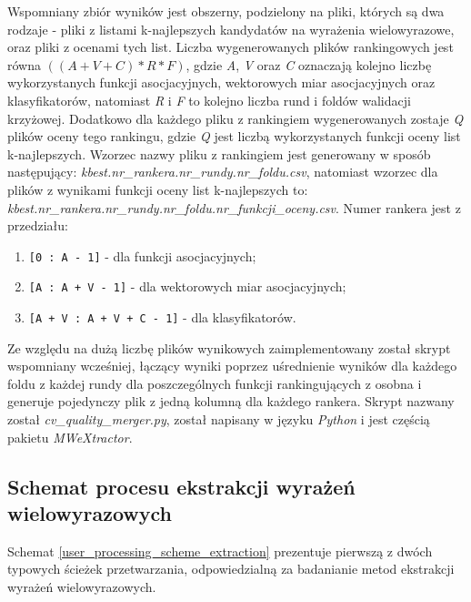 \documentclass[11pt,a4paper]{llncs}
\begin{document}
\par
Wspomniany zbiór wyników jest obszerny, podzielony na pliki, których są dwa rodzaje - pliki z listami k-najlepszych kandydatów na wyrażenia wielowyrazowe, oraz pliki z ocenami tych list.
Liczba wygenerowanych plików rankingowych jest równa \( ((A + V + C) * R * F) \), gdzie \emph{A}, \emph{V} oraz \emph{C} oznaczają kolejno liczbę wykorzystanych funkcji asocjacyjnych, wektorowych miar asocjacyjnych oraz klasyfikatorów, natomiast \emph{R} i \emph{F} to kolejno liczba rund i foldów walidacji krzyżowej.
Dodatkowo dla każdego pliku z rankingiem wygenerowanych zostaje \emph{Q} plików oceny tego rankingu, gdzie \emph{Q} jest liczbą wykorzystanych funkcji oceny list k-najlepszych.
Wzorzec nazwy pliku z rankingiem jest generowany w sposób następujący: \emph{kbest.nr\_rankera.nr\_rundy.nr\_foldu.csv}, natomiast wzorzec dla plików z wynikami funkcji oceny list k-najlepszych to: \emph{kbest.nr\_rankera.nr\_rundy.nr\_foldu.nr\_funkcji\_oceny.csv}.
Numer rankera jest z przedziału:
\begin{enumerate}
  \item \texttt{[0     : A         - 1]} - dla funkcji asocjacyjnych;
  \item \texttt{[A     : A + V     - 1]} - dla wektorowych miar asocjacyjnych;
  \item \texttt{[A + V : A + V + C - 1]} - dla klasyfikatorów.
\end{enumerate}

Ze względu na dużą liczbę plików wynikowych zaimplementowany został skrypt wspomniany wcześniej, łączący wyniki poprzez uśrednienie wyników dla każdego foldu z każdej rundy dla poszczególnych funkcji rankingujących z osobna i generuje pojedynczy plik z jedną kolumną dla każdego rankera.
Skrypt nazwany został \emph{cv\_quality\_merger.py}, został napisany w języku \emph{Python} i jest częścią pakietu \emph{MWeXtractor}.


\subsection{Schemat procesu ekstrakcji wyrażeń wielowyrazowych}
Schemat \ref{user_processing_scheme_extraction} prezentuje pierwszą z dwóch typowych ścieżek przetwarzania, odpowiedzialną za badanianie metod ekstrakcji wyrażeń wielowyrazowych.
\end{document}
